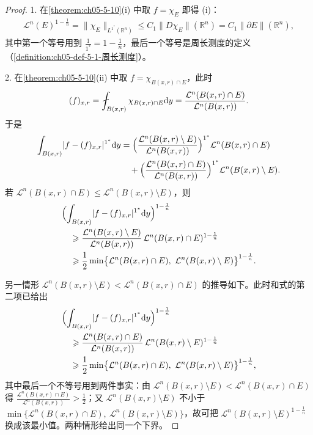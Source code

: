 ﻿\documentclass[../../main.tex]{subfiles}%
\begin{document}
\begin{proof}
1. 在\cref{theorem:ch05-5-10}(i) 中取 $f=\chi_E$ 即得 (i)：%
\begin{align*}
\mathcal{L}^n(E)^{1-\frac1n}=\lVert\chi_E\rVert_{L^{1^*}(\mathbb{R}^n)}\leqslant C_1\lVert D\chi_E\rVert(\mathbb{R}^n)=C_1\lVert\partial E\rVert(\mathbb{R}^n),
\end{align*}
其中第一个等号用到 $\frac{1}{1^*}=1-\frac1n$，最后一个等号是周长测度的定义（\cref{definition:ch05-def-5-1-周长测度}）。%

2. 在\cref{theorem:ch05-5-10}(ii) 中取 $f=\chi_{B(x,r)\cap E}$，此时%
\begin{align*}
(f)_{x,r}=\fint_{B(x,r)}\chi_{B(x,r)\cap E}\diff y=\frac{\mathcal{L}^n(B(x,r)\cap E)}{\mathcal{L}^n(B(x,r))}.
\end{align*}
于是
\begin{align*}
\int_{B(x,r)}\lvert f-(f)_{x,r}\rvert^{1^*}\mathrm{d} y
&=\Bigl(\frac{\mathcal{L}^n(B(x,r)\setminus E)}{\mathcal{L}^n(B(x,r))}\Bigr)^{1^*}\mathcal{L}^n(B(x,r)\cap E)\\
&\quad+\Bigl(\frac{\mathcal{L}^n(B(x,r)\cap E)}{\mathcal{L}^n(B(x,r))}\Bigr)^{1^*}\mathcal{L}^n(B(x,r)\setminus E).
\end{align*}
若 $\mathcal{L}^n(B(x,r)\cap E)\leqslant\mathcal{L}^n(B(x,r)\setminus E)$，则
\begin{align*}
&\Bigl(\int_{B(x,r)}\lvert f-(f)_{x,r}\rvert^{1^*}\diff y\Bigr)^{1-\frac1n}\\
&\quad\geqslant\frac{\mathcal{L}^n(B(x,r)\setminus E)}{\mathcal{L}^n(B(x,r))}\,\mathcal{L}^n(B(x,r)\cap E)^{1-\frac1n}\\
&\quad\geqslant\frac12\min\bigl\{\mathcal{L}^n(B(x,r)\cap E),\ \mathcal{L}^n(B(x,r)\setminus E)\bigr\}^{1-\frac1n}.
\end{align*}

另一情形 $\mathcal{L}^n(B(x,r)\setminus E)<\mathcal{L}^n(B(x,r)\cap E)$ 的推导如下。此时和式的第二项已给出
\begin{align*}
&\Bigl(\int_{B(x,r)}\lvert f-(f)_{x,r}\rvert^{1^*}\diff y\Bigr)^{1-\frac1n}\\
&\quad\geqslant\frac{\mathcal{L}^n(B(x,r)\cap E)}{\mathcal{L}^n(B(x,r))}\,\mathcal{L}^n(B(x,r)\setminus E)^{1-\frac1n}\\
&\quad\geqslant\frac12\min\bigl\{\mathcal{L}^n(B(x,r)\cap E),\ \mathcal{L}^n(B(x,r)\setminus E)\bigr\}^{1-\frac1n},
\end{align*}
其中最后一个不等号用到两件事实：由 $\mathcal{L}^n(B(x,r)\setminus E)<\mathcal{L}^n(B(x,r)\cap E)$ 得 $\frac{\mathcal{L}^n(B(x,r)\cap E)}{\mathcal{L}^n(B(x,r))}>\frac12$；又 $\mathcal{L}^n(B(x,r)\setminus E)$ 不小于 $\min\bigl\{\mathcal{L}^n(B(x,r)\cap E),\ \mathcal{L}^n(B(x,r)\setminus E)\bigr\}$，故可把 $\mathcal{L}^n(B(x,r)\setminus E)^{1-\frac1n}$ 换成该最小值。两种情形给出同一个下界。


\end{proof}
\end{document}
